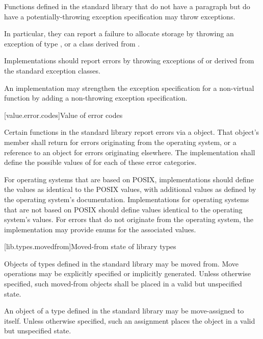 \pnum
Functions defined in the
\Cpp{} standard library
%
that do not have a \throws paragraph
but do have a potentially-throwing exception specification
may throw  exceptions.
\begin{footnote}
In particular, they
can report a failure to allocate storage by throwing an exception of type
,
or a class derived from
.
\end{footnote}
Implementations should
report errors by throwing exceptions of or derived
from the standard
exception classes.

\pnum
An implementation may strengthen the
exception specification
for a non-virtual function
by adding a non-throwing exception specification.

[value.error.codes]{Value of error codes}

\pnum
Certain functions in the \Cpp{} standard library report errors via a
 object. That object's
 member shall return  for
errors originating from the operating system, or a reference to an
  object for errors originating elsewhere.
The implementation shall define the possible values of  for each of these
error categories.
\begin{example}
For operating systems that are based on POSIX,
implementations should define the  values as
identical to the POSIX  values, with additional values as defined by the
operating system's documentation. Implementations for operating systems that are not
based on POSIX should define values identical to the operating system's
values. For errors that do not originate from the operating system, the implementation
may provide enums for the associated values.
\end{example}

[lib.types.movedfrom]{Moved-from state of library types}

\pnum
Objects of types defined in the \Cpp{} standard library may be moved
from. Move operations may be explicitly specified or
implicitly generated. Unless otherwise specified, such moved-from objects shall
be placed in a valid but unspecified state.

\pnum
An object of a type defined in the \Cpp{} standard library may be
move-assigned to itself.
Unless otherwise specified, such an assignment places the object in
a valid but unspecified state.
